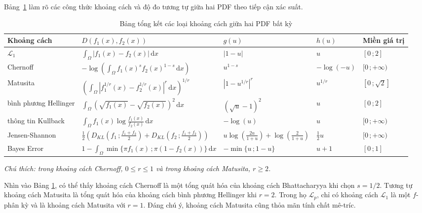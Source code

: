 \documentclass[a4paper,oneside]{book} %
\theoremstyle{plain}
\theoremstyle{plain}
\theoremstyle{nonumberplain}
\begin{document}
Bảng~\ref{tab1:KC_PDF} làm rõ các công thức khoảng cách và độ đo tương tự giữa hai PDF theo tiếp cận xác suất.
\begin{table}[H]
	\caption{Bảng tổng kết các loại khoảng cách giữa hai PDF bất kỳ}\label{tab1:KC_PDF}
	\centering\scriptsize
	\begin{tabular*}{\columnwidth}{@{\extracolsep\fill}lllll@{\extracolsep\fill}} 
		\toprule
		\bf Khoảng cách & \bf $D(f_1(x), f_2(x))$ & \bf $g(u)$ & \bf $h(u)$ & \bf Miền giá trị  \\ \midrule
		$\mathcal{L}_1$ & $\displaystyle\int_{\Omega}|f_1(x) - f_2(x)|\mathrm{\,d}x$ & $|1-u|$ & $u$ & $[0\,;2]$ \\
		Chernoff & $-\log\left(\displaystyle\int_{\Omega} f_1(x)^s f_2(x)^{1-s}\mathrm{\,d}x\right)$ & $u^{1-s}$ & $-\log(-u)$ & $[0\,;+\infty)$ \\
		Matusita & $\left(\displaystyle\int_{\Omega}\left|f_1^{1/r}(x) - f_2^{1/r}(x)\right|^r\mathrm{\,d}x\right)^{1/r}$ & $\left|1-u^{1/r}\right|^{r}$ & $u^{1/r}$ & $[0\,; \sqrt{2}]$ \\
		bình phương Hellinger & $\displaystyle\int_{\Omega}\left(\sqrt{f_1(x)}-\sqrt{f_2(x)}\right)^2\mathrm{\,d}x$ & $(\sqrt{u}-1)^2$ & $u$ & $[0\,;2]$ \\
		thông tin Kullback&$\displaystyle\int_{\Omega} f_1(x)\log\frac{f_1(x)}{f_2(x)}\mathrm{\,d}x$ & $-\log(u)$ & $u$ & $[0\,;+\infty)$ \\
		 Jensen-Shannon & $\frac{1}{2}\left(D_{KL}(f_1\,; \frac{f_1+f_2}{2}) + D_{KL}(f_2\,; \frac{f_1+f_2}{2})\right)$ & $u\log\left(\frac{2u}{1+u}\right)+\log\left(\frac{2}{1+u}\right)$ & $\frac{1}{2}u$ & $[0\,;+\infty)$ \\
	Bayes	Error &$1-\displaystyle\int_{\Omega} \min\{\pi f_1(x)\,;\pi (1-f_2(x))\}\mathrm{\,d}x$ &$-\min\{u\,;1-u\}$ & $u+1$ & $[0\,;1]$ \\
		\bottomrule
	\end{tabular*}
\begin{minipage}{\textwidth}
	\fontsize{11pt}{14pt}\selectfont\it
	Chú thích: trong khoảng cách Chernoff, $0\le r\le 1$ và trong khoảng cách Matusita, $r\ge2$. 
\end{minipage}
\end{table}


Nhìn vào Bảng \ref{tab1:KC_PDF}, có thể thấy khoảng cách Chernoff là một tổng quát hóa của khoảng cách Bhattacharyya khi chọn $s = 1/2$. Tương tự khoảng cách Matusita là tổng quát hóa của khoảng cách bình phương Hellinger khi $r=2$. Trong họ $\mathcal{L}_p$, chỉ có khoảng cách $\mathcal{L}_1$ là một $f$-phân kỳ và là khoảng cách Matusita với $r=1$. Đáng chú ý, khoảng cách Matusita cũng thỏa mãn tính chất mê-tríc.
\end{document}

